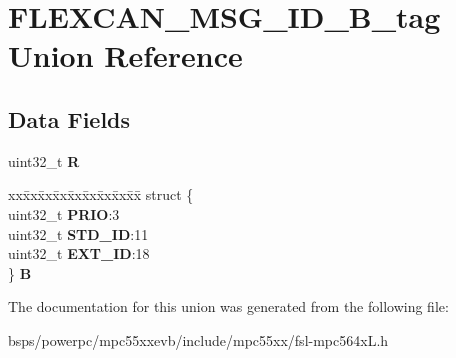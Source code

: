 \hypertarget{unionFLEXCAN__MSG__ID__32B__tag}{}\section{F\+L\+E\+X\+C\+A\+N\+\_\+\+M\+S\+G\+\_\+\+I\+D\+\_\+B\+\_\+tag Union Reference}
\label{unionFLEXCAN__MSG__ID__32B__tag}
\subsection*{Data Fields}
\begin{DoxyCompactItemize}
\item 
\mbox{\label{unionFLEXCAN__MSG__ID__32B__tag_a9db8d3f4bb9bf2e3e9e829eb57853a0d}} 
uint32\+\_\+t {\bfseries R}
\item 
\mbox{\label{unionFLEXCAN__MSG__ID__32B__tag_a48a25041caab009930308e1fc0c287fb}} 
\begin{tabbing}
xx\=xx\=xx\=xx\=xx\=xx\=xx\=xx\=xx\=\kill
struct \{\\
\>uint32\_t {\bfseries PRIO}:3\\
\>uint32\_t {\bfseries STD\_ID}:11\\
\>uint32\_t {\bfseries EXT\_ID}:18\\
\} {\bfseries B}\\

\end{tabbing}\end{DoxyCompactItemize}


The documentation for this union was generated from the following file\+:\begin{DoxyCompactItemize}
\item 
bsps/powerpc/mpc55xxevb/include/mpc55xx/fsl-\/mpc564x\+L.\+h\end{DoxyCompactItemize}
